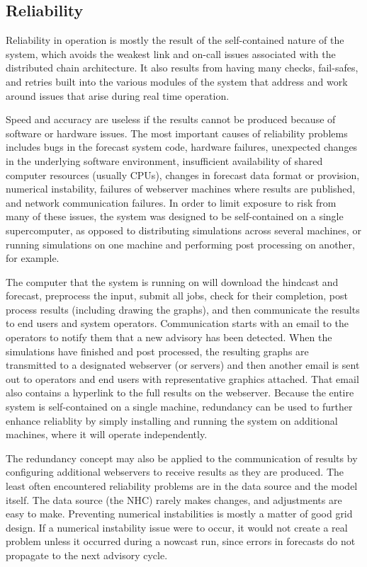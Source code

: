 \documentclass[12pt]{article}
\begin{document}
\subsection{Reliability}

Reliability in operation is mostly the result of the self-contained 
nature of the system, which avoids the weakest link and on-call 
issues associated with the distributed chain architecture. It also 
results from having many checks, fail-safes, and retries built into 
the various modules of the system that address and work around issues
that arise during real time operation. 

Speed and accuracy are useless if the results cannot be produced 
because of software or hardware issues. The most important causes of 
reliability problems includes bugs in the forecast system code, 
hardware failures, unexpected changes in the underlying software 
environment, insufficient availability of shared computer resources 
(usually CPUs), changes in forecast data format or provision, 
numerical instability, failures of webserver machines where results 
are published, and network communication failures. In order to limit 
exposure to risk from many of these issues, the system was designed 
to be self-contained on a single supercomputer, as opposed to 
distributing simulations across several machines, or running 
simulations on one machine and performing post processing on 
another, for example. 

The computer that the system is running on will download the 
hindcast and forecast, preprocess the input, submit all jobs, check 
for their completion, post process results (including drawing the 
graphs), and then communicate the results to end users and system 
operators. Communication starts with an email to the operators to 
notify them that a new advisory has been detected. When the 
simulations have finished and post processed, the resulting graphs 
are transmitted to a designated webserver (or servers) and then 
another email is sent out to operators and end users with 
representative graphics attached. That email also contains a 
hyperlink to the full results on the webserver. Because the entire 
system is self-contained on a single machine, redundancy can be used 
to further enhance reliablity by simply installing and running the 
system on additional machines, where it will operate independently. 

The redundancy concept may also be applied to the communication of 
results by configuring additional webservers to receive results as 
they are produced. The least often encountered reliability problems 
are in the data source and the model itself. The data source (the 
NHC) rarely makes changes, and adjustments are easy to make. 
Preventing numerical instabilities is mostly a matter of good grid 
design. If a numerical instability issue were to occur, it would not 
create a real problem unless it occurred during a nowcast run, since 
errors in forecasts do not propagate to the next advisory cycle.
\end{document}
